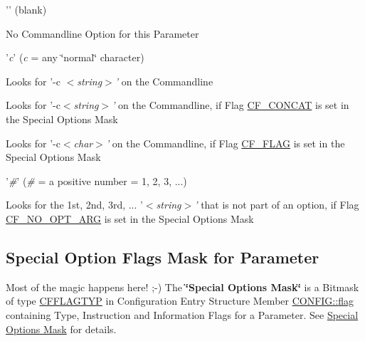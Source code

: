 \begin{DoxyItemize}
\item '{\itshape  \/}' (blank)
\begin{DoxyItemize}
\item No Commandline Option for this Parameter
\end{DoxyItemize}\end{DoxyItemize}
\begin{DoxyItemize}
\item '{\itshape c\/}' ({\itshape c\/} = any \char`\"{}normal\char`\"{} character)
\begin{DoxyItemize}
\item Looks for '-\/c $<${\itshape string$>$'\/} on the Commandline
\item Looks for '-\/c$<${\itshape string$>$'\/} on the Commandline, if Flag \hyperlink{group__special__options__mask_ga9e526dae88bf6803772107ff283637b5}{C\-F\-\_\-\-C\-O\-N\-C\-A\-T} is set in the Special Options Mask
\item Looks for '-\/c$<${\itshape char$>$'\/} on the Commandline, if Flag \hyperlink{group__special__options__mask_ga1d1f1d1b6eac6b5d9970102318ab2667}{C\-F\-\_\-\-F\-L\-A\-G} is set in the Special Options Mask
\end{DoxyItemize}\end{DoxyItemize}
\begin{DoxyItemize}
\item '{\itshape \#\/}' ({\itshape \#\/} = a positive number = 1, 2, 3, ...)
\begin{DoxyItemize}
\item Looks for the 1st, 2nd, 3rd, ... '$<${\itshape string$>$'\/} that is not part of an option, if Flag \hyperlink{group__special__options__mask_ga97d17b070dac10c14d3930c58bfba76f}{C\-F\-\_\-\-N\-O\-\_\-\-O\-P\-T\-\_\-\-A\-R\-G} is set in the Special Options Mask
\end{DoxyItemize}\end{DoxyItemize}
\hypertarget{config_initializer_parameter_flagmask}{}\subsection{Special Option Flags Mask for Parameter}\label{config_initializer_parameter_flagmask}
Most of the magic happens here! ;-\/) The {\bfseries \char`\"{}\-Special Options Mask\char`\"{}} is a Bitmask of type \hyperlink{group__special__options__mask_ga4854f1596d5c6e0604a478fa9a2e23f0}{C\-F\-F\-L\-A\-G\-T\-Y\-P} in Configuration Entry Structure Member \hyperlink{struct_c_o_n_f_i_g_ab04d08abdf758c0400caaded716f4089}{C\-O\-N\-F\-I\-G\-::flag} containing Type, Instruction and Information Flags for a Parameter.  See \hyperlink{group__special__options__mask}{Special Options Mask} for details.

